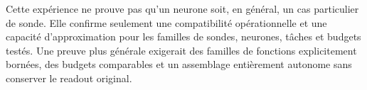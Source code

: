 \documentclass[11pt,a4paper]{article}
\begin{document}
Cette expérience ne prouve pas qu'un neurone soit, en général, un cas particulier de sonde. Elle confirme seulement une compatibilité opérationnelle et une capacité d'approximation pour les familles de sondes, neurones, tâches et budgets testés. Une preuve plus générale exigerait des familles de fonctions explicitement bornées, des budgets comparables et un assemblage entièrement autonome sans conserver le readout original.
\end{document}
